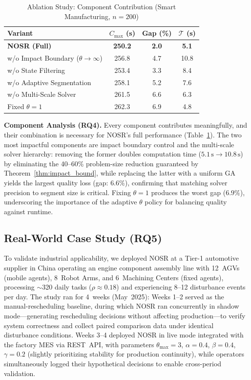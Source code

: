 \documentclass[manuscript,screen,review]{acmart}
\begin{document}
\begin{table}[t]
\centering
\caption{Ablation Study: Component Contribution
(Smart Manufacturing, $n = 200$)}
\label{tab:ablation}
\small
\begin{tabular}{@{}lccc@{}}
\toprule
\textbf{Variant}
  & $C_{\max}$ \textbf{(s)}
  & \textbf{Gap (\%)}
  & $\mathcal{T}$ \textbf{(s)} \\
\midrule
\textbf{NOSR (Full)}          & \textbf{250.2} & \textbf{2.0} & \textbf{5.1} \\
\midrule
w/o Impact Boundary ($\theta \to \infty$) & 256.8 & 4.7 & 10.8 \\
w/o State Filtering           & 253.4 & 3.3 &  8.4 \\
w/o Adaptive Segmentation     & 258.1 & 5.2 &  7.6 \\
w/o Multi-Scale Solver        & 261.5 & 6.6 &  6.3 \\
Fixed $\theta = 1$            & 262.3 & 6.9 &  4.8 \\
\bottomrule
\end{tabular}
\end{table}

\noindent\textbf{Component Analysis (RQ4).}
Every component contributes meaningfully, and their combination is
necessary for NOSR's full performance (Table~\ref{tab:ablation}).
The two most impactful components are impact boundary control and the
multi-scale solver hierarchy: removing the former doubles computation
time ($5.1\,\text{s} \to 10.8\,\text{s}$) by eliminating the
40--60\% problem-size reduction guaranteed by
Theorem~\ref{thm:impact_bound}, while replacing the latter with a
uniform GA yields the largest quality loss (gap: $6.6\%$), confirming
that matching solver precision to segment size is critical.
Fixing $\theta=1$ produces the worst gap ($6.9\%$), underscoring the
importance of the adaptive $\theta$ policy for balancing quality
against runtime.

\subsection{Real-World Case Study (RQ5)}
\label{sec:case_study}

To validate industrial applicability, we deployed NOSR at a Tier-1 automotive supplier in China operating an engine component assembly line with 12~AGVs (mobile agents), 8~Robot Arms, and 6~Machining Centers (fixed agents),
processing $\sim$320 daily tasks ($\rho \approx 0.18$) and experiencing 8--12 disturbance events per day. The study ran for 4~weeks (May~2025):
Weeks 1–2 served as the manual-rescheduling baseline, during which NOSR ran 
concurrently in shadow mode—generating rescheduling decisions without affecting 
production—to verify system correctness and collect paired comparison data under 
identical disturbance conditions. 
Weeks 3--4 deployed NOSR in live mode integrated with the factory MES via REST~API, with parameters $\theta_{\max}=3$, $\alpha=0.4$, $\beta=0.4$, $\gamma=0.2$ (slightly prioritizing stability for production continuity), 
while operators simultaneously logged their hypothetical decisions to enable cross-period validation.
\end{document}
